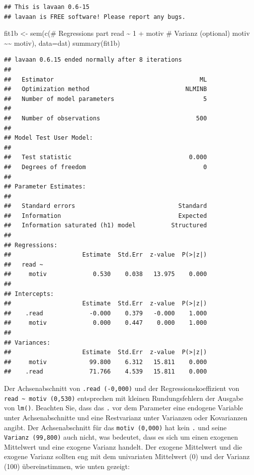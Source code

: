 \documentclass[
]{article}
\newenvironment{Shaded}{\begin{snugshade}}{\end{snugshade}}
\newcommand{\AttributeTok}[1]{\textcolor[rgb]{0.77,0.63,0.00}{#1}}
\newcommand{\FunctionTok}[1]{\textcolor[rgb]{0.00,0.00,0.00}{#1}}
\newcommand{\NormalTok}[1]{#1}
\newcommand{\OtherTok}[1]{\textcolor[rgb]{0.56,0.35,0.01}{#1}}
\newcommand{\StringTok}[1]{\textcolor[rgb]{0.31,0.60,0.02}{#1}}
\begin{document}
\begin{verbatim}
## This is lavaan 0.6-15
## lavaan is FREE software! Please report any bugs.
\end{verbatim}

\begin{Shaded}
\begin{Highlighting}[]
\NormalTok{fit1b }\OtherTok{\textless{}{-}} \FunctionTok{sem}\NormalTok{(}\FunctionTok{c}\NormalTok{(}\StringTok{\textquotesingle{}\# Regressions part}
\StringTok{                read \textasciitilde{} 1 + motiv}
\StringTok{                \# Varianz (optional)}
\StringTok{                motiv \textasciitilde{}\textasciitilde{} motiv\textquotesingle{}}\NormalTok{), }
             \AttributeTok{data=}\NormalTok{dat)}
\FunctionTok{summary}\NormalTok{(fit1b)}
\end{Highlighting}
\end{Shaded}

\begin{verbatim}
## lavaan 0.6.15 ended normally after 8 iterations
## 
##   Estimator                                         ML
##   Optimization method                           NLMINB
##   Number of model parameters                         5
## 
##   Number of observations                           500
## 
## Model Test User Model:
##                                                       
##   Test statistic                                 0.000
##   Degrees of freedom                                 0
## 
## Parameter Estimates:
## 
##   Standard errors                             Standard
##   Information                                 Expected
##   Information saturated (h1) model          Structured
## 
## Regressions:
##                    Estimate  Std.Err  z-value  P(>|z|)
##   read ~                                              
##     motiv             0.530    0.038   13.975    0.000
## 
## Intercepts:
##                    Estimate  Std.Err  z-value  P(>|z|)
##    .read             -0.000    0.379   -0.000    1.000
##     motiv             0.000    0.447    0.000    1.000
## 
## Variances:
##                    Estimate  Std.Err  z-value  P(>|z|)
##     motiv            99.800    6.312   15.811    0.000
##    .read             71.766    4.539   15.811    0.000
\end{verbatim}

Der Achsenabschnitt von \texttt{.read\ (-0,000)} und der
Regressionskoeffizient von
\texttt{read\ \textasciitilde{}\ motiv\ (0,530)} entsprechen mit kleinen
Rundungsfehlern der Ausgabe von \texttt{lm()}. Beachten Sie, dass das
\texttt{.} vor dem Parameter eine endogene Variable unter
Achsenabschnitte und eine Restvarianz unter Varianzen oder Kovarianzen
angibt. Der Achsenabschnitt für das \texttt{motiv\ (0,000)} hat kein
\texttt{.} und seine \texttt{Varianz\ (99,800)} auch nicht, was
bedeutet, dass es sich um einen exogenen Mittelwert und eine exogene
Varianz handelt. Der exogene Mittelwert und die exogene Varianz sollten
eng mit dem univariaten Mittelwert (0) und der Varianz (100)
übereinstimmen, wie unten gezeigt:
\end{document}
